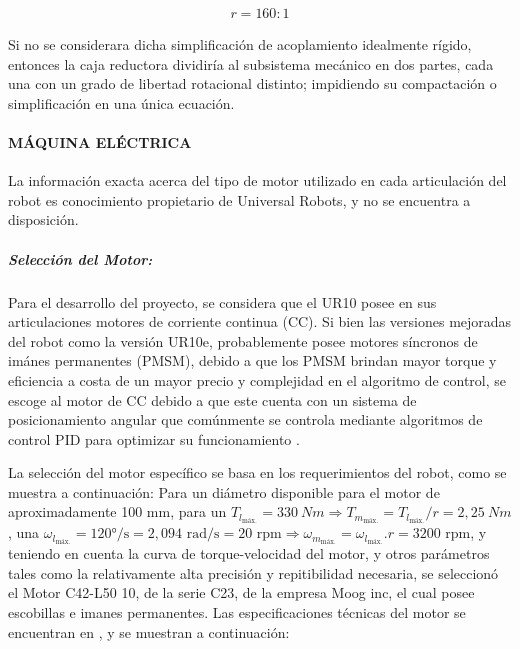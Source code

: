 \documentclass{article}
\begin{document}
\begin{sloppypar}
\begin{align} \label{eq:Valor de r}
	r = 160\text{}{:}1
\end{align}

Si no se considerara dicha simplificación de acoplamiento idealmente rígido, entonces la caja reductora dividiría al subsistema mecánico en dos partes, cada una con un grado de libertad rotacional distinto; impidiendo su compactación o simplificación en una única ecuación.


\paragraph{MÁQUINA ELÉCTRICA}
\label{sec:MÁQUINA ELÉCTRICA}
\hfill

\hfill


La información exacta acerca del tipo de motor utilizado en cada articulación del robot es conocimiento propietario de Universal Robots, y no se encuentra a disposición.

\subparagraph{Selección del Motor:}
\label{sec:Selección del Motor:}
\hfill

\hfill

Para el desarrollo del proyecto, se considera que el UR10 posee en sus articulaciones motores de corriente continua (CC). Si bien las versiones mejoradas del robot como la versión UR10e, probablemente posee motores síncronos de imánes permanentes (PMSM), debido a que los PMSM brindan mayor torque y eficiencia a costa de un mayor precio y complejidad en el algoritmo de control, se escoge al motor de CC debido a que este cuenta con un sistema de posicionamiento angular que comúnmente se controla mediante algoritmos de control PID para optimizar su funcionamiento \cite{arenas2023virtual}.

La selección del motor específico se basa en los requerimientos del robot, como se muestra a continuación:
Para un diámetro disponible para el motor de aproximadamente 100 mm, para un $T_{l_{\text{máx.}}}=330 ~Nm \Rightarrow T_{m_{\text{máx.}}}=T_{l_{\text{máx.}}}/r=2,25 ~Nm$, una $\omega_{l_{\text{máx.}}}=120\text{°/s}=2,094\text{ rad/s}=20\text{  rpm} \Rightarrow \omega_{m_{\text{máx.}}}=\omega_{l_{\text{máx.}}}.r=3200\text{  rpm}$, y teniendo en cuenta la curva de torque-velocidad del motor, y otros parámetros tales como la relativamente alta precisión y repitibilidad necesaria, se seleccionó el Motor C42-L50 10, de la serie C23, de la empresa Moog inc, el cual posee escobillas e imanes permanentes. Las especificaciones técnicas del motor se encuentran en \cite{MoogMotorDatasheet}, y se muestran a continuación:


\end{sloppypar}
\end{document}
